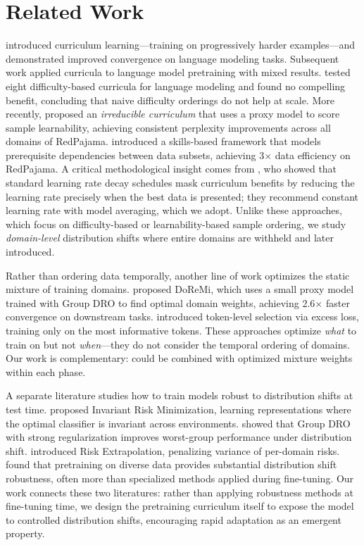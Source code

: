 \section{Related Work}
\label{sec:related}

\citet{bengio2009curriculum} introduced curriculum learning---training on progressively harder examples---and demonstrated improved convergence on language modeling tasks. Subsequent work applied curricula to language model pretraining with mixed results. \citet{campos2021corpus} tested eight difficulty-based curricula for language modeling and found no compelling benefit, concluding that naive difficulty orderings do not help at scale. More recently, \citet{fan2023irreducible} proposed an \emph{irreducible curriculum} that uses a proxy model to score sample learnability, achieving consistent perplexity improvements across all domains of RedPajama. \citet{chen2023skillit} introduced a skills-based framework that models prerequisite dependencies between data subsets, achieving 3$\times$ data efficiency on RedPajama. A critical methodological insight comes from \citet{luo2025lrdecay}, who showed that standard learning rate decay schedules mask curriculum benefits by reducing the learning rate precisely when the best data is presented; they recommend constant learning rate with model averaging, which we adopt. Unlike these approaches, which focus on difficulty-based or learnability-based sample ordering, we study \emph{domain-level} distribution shifts where entire domains are withheld and later introduced.

Rather than ordering data temporally, another line of work optimizes the static mixture of training domains. \citet{xie2023doremi} proposed DoReMi, which uses a small proxy model trained with Group DRO to find optimal domain weights, achieving 2.6$\times$ faster convergence on downstream tasks. \citet{lin2024rho1} introduced token-level selection via excess loss, training only on the most informative tokens. These approaches optimize \emph{what} to train on but not \emph{when}---they do not consider the temporal ordering of domains. Our work is complementary: \dsc could be combined with optimized mixture weights within each phase.

A separate literature studies how to train models robust to distribution shifts at test time. \citet{arjovsky2019irm} proposed Invariant Risk Minimization, learning representations where the optimal classifier is invariant across environments. \citet{sagawa2019dro} showed that Group DRO with strong regularization improves worst-group performance under distribution shift. \citet{krueger2021rex} introduced Risk Extrapolation, penalizing variance of per-domain risks. \citet{yi2022pretrain} found that pretraining on diverse data provides substantial distribution shift robustness, often more than specialized methods applied during fine-tuning. Our work connects these two literatures: rather than applying robustness methods at fine-tuning time, we design the pretraining curriculum itself to expose the model to controlled distribution shifts, encouraging rapid adaptation as an emergent property.

